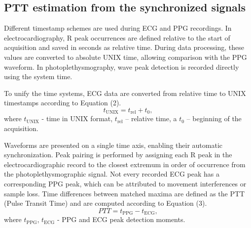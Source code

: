 \documentclass[journal]{IEEEtran}
\begin{document}
\subsection{PTT estimation from the synchronized signals}
Different timestamp schemes are used during ECG and PPG recordings. In electrocardiography, R peak occurrences are defined relative to the start of acquisition and saved in seconds as relative time. During data processing, these values are converted to absolute UNIX time, allowing comparison with the PPG waveform. In photoplethysmography, wave peak detection is recorded directly using the system time.

To unify the time systems, ECG data are converted from relative time to UNIX timestamps according to Equation (2).
\begin{equation}
t_{\mathrm{UNIX}} = t_{\mathrm{rel}} + t_{0},
\end{equation}
where $t_{\mathrm{UNIX}}$ - time in UNIX format, $t_{\mathrm{rel}}$ – relative time, a $t_{0}$ – beginning of the acquisition.

Waveforms are presented on a single time axis, enabling their automatic synchronization. Peak pairing is performed by assigning each R peak in the electrocardiographic record to the closest extremum in order of occurrence from the photoplethysmographic signal. Not every recorded ECG peak has a corresponding PPG peak, which can be attributed to movement interferences or sample loss. Time differences between matched maxima are defined as the PTT (Pulse Transit Time) and are computed according to Equation (3).
\begin{equation}
PTT = t_{\mathrm{PPG}} - t_{\mathrm{ECG}},
\end{equation}
where $t_{\mathrm{PPG}}$, $t_{\mathrm{ECG}}$ - PPG and ECG peak detection moments. 
\end{document}
